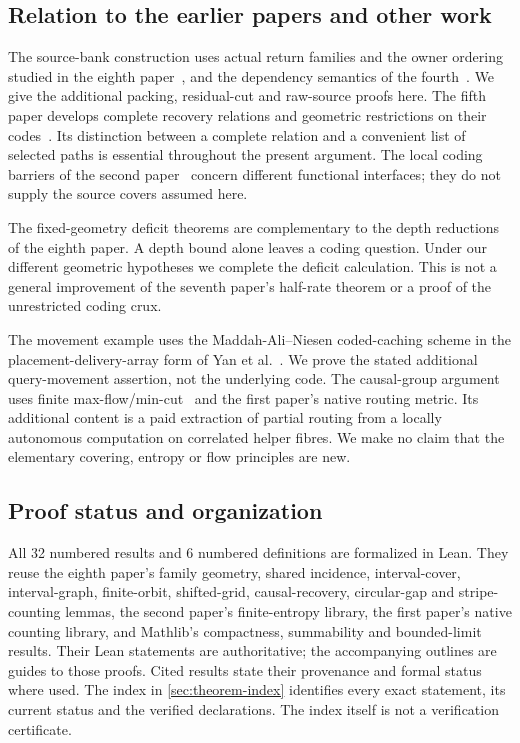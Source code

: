 \subsection{Relation to the earlier papers and other work}

The source-bank construction uses actual return families and the owner
ordering studied in the eighth paper~\cite{EighthPaper2026}, and the
dependency semantics of the fourth~\cite{FourthPaper2026}. We give the
additional packing, residual-cut and raw-source proofs here.
The fifth paper develops complete recovery relations and geometric
restrictions on their codes~\cite{DirectedRecovery2026}. Its distinction
between a complete relation and a convenient list of selected paths is
essential throughout the present argument. The local coding barriers of
the second paper~\cite{SecondPaper2026} concern different functional
interfaces; they do not supply the source covers assumed here.

The fixed-geometry deficit theorems are complementary to the depth
reductions of the eighth paper. A depth bound alone leaves a coding
question. Under our different geometric hypotheses we complete the
deficit calculation. This is not a general improvement of the seventh
paper's half-rate theorem or a proof of the unrestricted coding crux.

The movement example uses the Maddah-Ali--Niesen coded-caching scheme
\cite{MaddahAliNiesen2014} in the placement-delivery-array form of
Yan et al.~\cite{YanChengTangChen2017}. We prove the stated additional
query-movement assertion, not the underlying code. The causal-group
argument uses finite max-flow/min-cut~\cite{FordFulkerson1956} and the
first paper's native routing metric. Its additional content is a paid
extraction of partial routing from a locally autonomous computation on
correlated helper fibres. We make no claim that the elementary covering,
entropy or flow principles are new.

\subsection{Proof status and organization}

All 32 numbered results and 6 numbered definitions
are formalized in Lean. They reuse the eighth paper's family geometry,
shared incidence, interval-cover, interval-graph, finite-orbit,
shifted-grid, causal-recovery, circular-gap and stripe-counting lemmas,
the second paper's finite-entropy library, the first paper's native
counting library, and Mathlib's compactness, summability and bounded-limit results. Their Lean statements are
authoritative; the accompanying outlines are guides to those proofs.
Cited results state their provenance and formal status
where used. The index in \cref{sec:theorem-index} identifies every exact statement,
its current status and the verified declarations. The index itself is not a
verification certificate.

